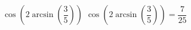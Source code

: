  {$\cos\left(2 \arcsin\left(\dfrac{3}{5}\right)\right)$}
{ $\cos\left(2 \arcsin\left(\dfrac{3}{5}\right)\right) = \dfrac{7}{25}$}
